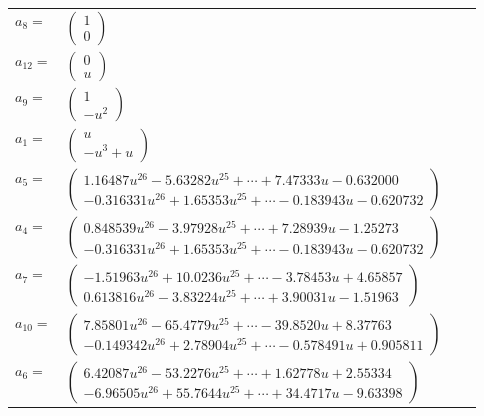 \documentclass[1p]{elsarticle_modified}
\theoremstyle{definition}
\begin{document}
\begin{tabular}{m{7pt} m{180pt} m{7pt} m{180pt} }
\flushright $a_{8}=$&$\begin{pmatrix}1\\0\end{pmatrix}$ \\
\flushright $a_{12}=$&$\begin{pmatrix}0\\u\end{pmatrix}$ \\
\flushright $a_{9}=$&$\begin{pmatrix}1\\- u^2\end{pmatrix}$ \\
\flushright $a_{1}=$&$\begin{pmatrix}u\\- u^3+u\end{pmatrix}$ \\
\flushright $a_{5}=$&$\begin{pmatrix}1.16487 u^{26}-5.63282 u^{25}+\cdots+7.47333 u-0.632000\\-0.316331 u^{26}+1.65353 u^{25}+\cdots-0.183943 u-0.620732\end{pmatrix}$ \\
\flushright $a_{4}=$&$\begin{pmatrix}0.848539 u^{26}-3.97928 u^{25}+\cdots+7.28939 u-1.25273\\-0.316331 u^{26}+1.65353 u^{25}+\cdots-0.183943 u-0.620732\end{pmatrix}$ \\
\flushright $a_{7}=$&$\begin{pmatrix}-1.51963 u^{26}+10.0236 u^{25}+\cdots-3.78453 u+4.65857\\0.613816 u^{26}-3.83224 u^{25}+\cdots+3.90031 u-1.51963\end{pmatrix}$ \\
\flushright $a_{10}=$&$\begin{pmatrix}7.85801 u^{26}-65.4779 u^{25}+\cdots-39.8520 u+8.37763\\-0.149342 u^{26}+2.78904 u^{25}+\cdots-0.578491 u+0.905811\end{pmatrix}$ \\
\flushright $a_{6}=$&$\begin{pmatrix}6.42087 u^{26}-53.2276 u^{25}+\cdots+1.62778 u+2.55334\\-6.96505 u^{26}+55.7644 u^{25}+\cdots+34.4717 u-9.63398\end{pmatrix}$ \\

\end{tabular}
\end{document}
